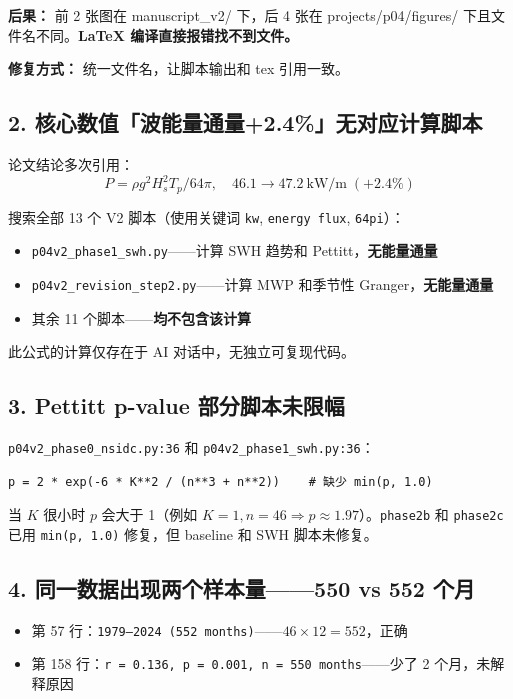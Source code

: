 \documentclass[11pt,a4paper]{article}
\begin{document}
\textbf{后果：} 前 2 张图在 manuscript\_v2/ 下，后 4 张在 projects/p04/figures/ 下且文件名不同。\textbf{LaTeX 编译直接报错找不到文件。}

\textbf{修复方式：} 统一文件名，让脚本输出和 tex 引用一致。

\subsection*{2. 核心数值「波能量通量+2.4\%」无对应计算脚本}

论文结论多次引用：
\[
P = \rho g^2 H_s^2 T_p / 64\pi,\quad 46.1 \rightarrow 47.2\ \text{kW/m}\;(+2.4\%)
\]

搜索全部 13 个 V2 脚本（使用关键词 \texttt{kw}, \texttt{energy flux}, \texttt{64pi}）：
\begin{itemize}
\item \texttt{p04v2\_phase1\_swh.py}——计算 SWH 趋势和 Pettitt，\textbf{无能量通量}
\item \texttt{p04v2\_revision\_step2.py}——计算 MWP 和季节性 Granger，\textbf{无能量通量}
\item 其余 11 个脚本——\textbf{均不包含该计算}
\end{itemize}

此公式的计算仅存在于 AI 对话中，无独立可复现代码。

\subsection*{3. Pettitt p-value 部分脚本未限幅}

\texttt{p04v2\_phase0\_nsidc.py:36} 和 \texttt{p04v2\_phase1\_swh.py:36}：

\begin{verbatim}
p = 2 * exp(-6 * K**2 / (n**3 + n**2))    # 缺少 min(p, 1.0)
\end{verbatim}

当 $K$ 很小时 $p$ 会大于 1（例如 $K=1, n=46 \Rightarrow p \approx 1.97$）。\texttt{phase2b} 和 \texttt{phase2c} 已用 \texttt{min(p, 1.0)} 修复，但 baseline 和 SWH 脚本未修复。

\subsection*{4. 同一数据出现两个样本量——550 vs 552 个月}

\begin{itemize}
\item 第 57 行：\texttt{1979--2024 (552 months)}——$46\times12=552$，正确
\item 第 158 行：\texttt{r = 0.136, p = 0.001, n = 550 months}——少了 2 个月，未解释原因
\end{itemize}
\end{document}
